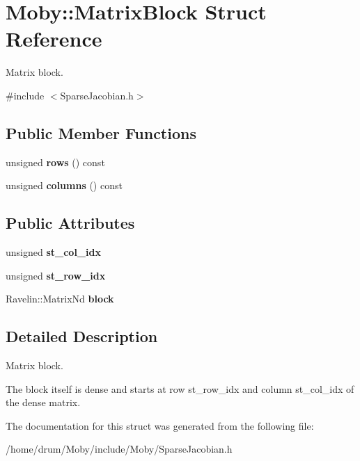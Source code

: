 \section{Moby\-:\-:Matrix\-Block Struct Reference}
\label{structMoby_1_1MatrixBlock}


Matrix block.  




{\ttfamily \#include $<$Sparse\-Jacobian.\-h$>$}

\subsection*{Public Member Functions}
\begin{DoxyCompactItemize}
\item 
unsigned {\bfseries rows} () const \label{structMoby_1_1MatrixBlock_aea229067d1ba93b738fd900c6b679e09}

\item 
unsigned {\bfseries columns} () const \label{structMoby_1_1MatrixBlock_a9c092dd6dc9708c1653292c81f7e24b5}

\end{DoxyCompactItemize}
\subsection*{Public Attributes}
\begin{DoxyCompactItemize}
\item 
unsigned {\bfseries st\-\_\-col\-\_\-idx}\label{structMoby_1_1MatrixBlock_aa643de96dcb5e1dc098a1c7b31ce90ca}

\item 
unsigned {\bfseries st\-\_\-row\-\_\-idx}\label{structMoby_1_1MatrixBlock_ab2ad71843925ebe0b047e3c66ffad2ad}

\item 
Ravelin\-::\-Matrix\-Nd {\bfseries block}\label{structMoby_1_1MatrixBlock_aa289ae627e4f3be31c60c3cf8bcf0f07}

\end{DoxyCompactItemize}


\subsection{Detailed Description}
Matrix block. 

The block itself is dense and starts at row st\-\_\-row\-\_\-idx and column st\-\_\-col\-\_\-idx of the dense matrix. 

The documentation for this struct was generated from the following file\-:\begin{DoxyCompactItemize}
\item 
/home/drum/\-Moby/include/\-Moby/Sparse\-Jacobian.\-h\end{DoxyCompactItemize}
